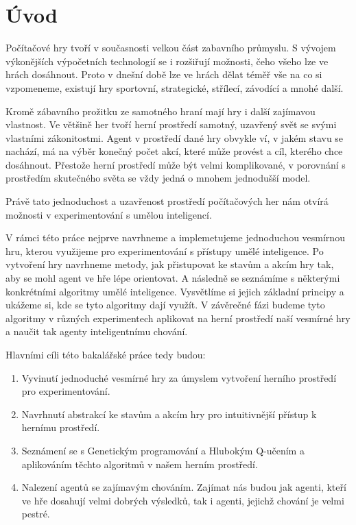 \chapter*{Úvod}


Počítačové hry tvoří v současnosti velkou část zabavního průmyslu. S vývojem výkonějších výpočetních technologií se i rozšiřují možnosti, čeho všeho lze ve hrách dosáhnout.
Proto v dnešní době lze ve hrách dělat téměř vše na co si vzpomeneme, existují hry sportovní, strategické, střílecí, závodící a mnohé další.
\par
Kromě zábavního prožitku ze samotného hraní mají hry i další zajímavou vlastnost.
Ve většině her tvoří herní prostředí samotný, uzavřený svět se svými vlastními zákonitostmi.
Agent v prostředí dané hry obvykle ví, v jakém stavu se nachází, má na výběr konečný počet akcí, které může provést
a cíl, kterého chce dosáhnout.
Přestože herní prostředí může být velmi komplikované, v porovnání s prostředím skutečného světa se vždy jedná o mnohem jednodušší model.

\par
Právě tato jednoduchost a uzavřenost prostředí počítačových her nám otvírá možnosti v experimentování s umělou inteligencí.

\par
V rámci této práce nejprve navrhneme a implemetujeme jednoduchou vesmírnou hru, kterou využijeme pro experimentování s přístupy umělé inteligence.
Po vytvoření hry navrhneme metody, jak přistupovat ke stavům a akcím hry tak, aby se mohl agent ve hře lépe orientovat.
A následně se seznámíme s některými konkrétními algoritmy umělé inteligence. Vysvětlíme si jejich základní principy a ukážeme si, kde se tyto algoritmy dají využít.
V závěrečné fázi budeme tyto algoritmy v různých experimentech aplikovat na herní prostředí naší vesmírné hry a naučit tak agenty inteligentnímu chování.

Hlavními cíli této bakalářské práce tedy budou:
\begin{enumerate}
    \item Vyvinutí jednoduché vesmírné hry za úmyslem vytvoření herního prostředí pro experimentování.
    \item Navrhnutí abstrakcí ke stavům a akcím hry pro intuitivnější přístup k hernímu prostředí.
    \item Seznámení se s Genetickým programování a Hlubokým Q-učením a aplikováním těchto algoritmů v našem herním prostředí.
    \item Nalezení agentů se zajímavým chováním. Zajímat nás budou jak agenti, kteří ve hře dosahují velmi dobrých výsledků, tak i agenti, jejichž chování je velmi pestré.
\end{enumerate}




